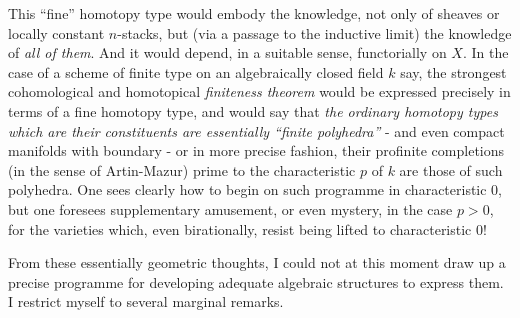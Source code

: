 This ``fine'' homotopy type would embody the knowledge, not only of sheaves or locally constant $n$-stacks, but (via a passage to the inductive limit) the knowledge of \emph{all of them}. And it would depend, in a suitable sense, functorially on $X$. In the case of a scheme of finite type on an algebraically closed field $k$ say, the strongest cohomological and homotopical \emph{finiteness theorem} would be expressed precisely in terms of a fine homotopy type, and would say that \emph{the ordinary homotopy types which are their constituents are essentially ``finite polyhedra''} - and even compact manifolds with boundary - or in more precise fashion, their profinite completions (in the sense of Artin-Mazur) prime to the characteristic $p$ of $k$ are those of such polyhedra. One sees clearly how to begin on such programme in characteristic 0, but one foresees supplementary amusement, or even mystery, in the case $p > 0$, for the varieties which, even birationally, resist being lifted to characteristic 0!

\starsbreak

\label{sec:app18}%
From these essentially geometric thoughts, I could not at this moment draw up a precise programme for developing adequate algebraic structures to express them. I restrict myself to several marginal remarks.

